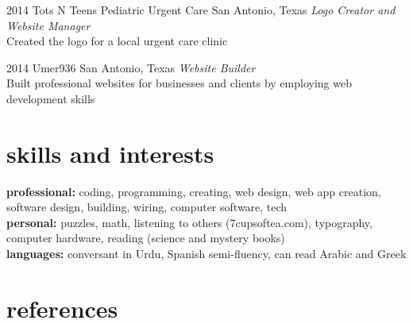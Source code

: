 \documentclass[]{friggeri-cv} %
\begin{document}
\begin{entrylist}

	\entry
	{2014}
	{Tots N Teens Pediatric Urgent Care}
	{San Antonio, Texas}
	{\emph{Logo Creator and Website Manager} \\
	Created the logo for a local urgent care clinic}


	\entry
	{2014}
	{Umer936}
	{San Antonio, Texas}
	{\emph{Website Builder} \\
	Built professional websites for businesses and clients by employing web development skills}

\end{entrylist}


\section{skills and interests}

\textbf{professional:} coding, programming, creating, web design, web app creation, software design, building, wiring, computer software, tech
\\
\textbf{personal:} puzzles, math, listening to others (7cupsoftea.com), typography, computer hardware, reading (science and mystery books)   \\
\textbf{languages:} conversant in Urdu, Spanish semi-fluency, can read Arabic and Greek

\pagebreak

\section{references}


\end{document}
